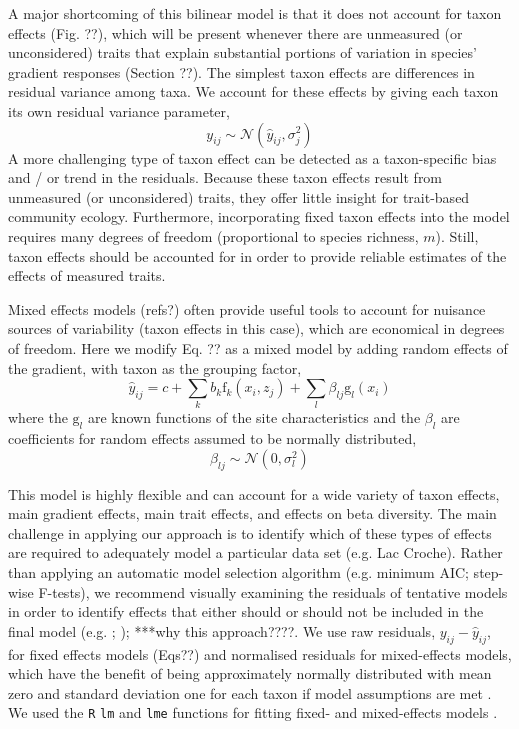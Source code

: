 \documentclass[12pt]{ecology}
\begin{document}
A major shortcoming of this bilinear model is that it does not account for taxon effects (Fig. ??), which will be present whenever there are unmeasured (or unconsidered) traits that explain substantial portions of variation in species' gradient responses (Section ??).  The simplest taxon effects are differences in residual variance among taxa.  We account for these effects by giving each taxon its own residual variance parameter,
\begin{equation}
y_{ij} \sim \mathcal{N}(\hat{y}_{ij},\sigma_j^2)
\end{equation}
A more challenging type of taxon effect can be detected as a taxon-specific bias and / or trend in the residuals.  Because these taxon effects result from unmeasured (or unconsidered) traits, they offer little insight for trait-based community ecology.  Furthermore, incorporating fixed taxon effects into the model requires many degrees of freedom (proportional to species richness, $m$).  Still, taxon effects should be accounted for in order to provide reliable estimates of the effects of measured traits.

Mixed effects models (refs?) often provide useful tools to account for nuisance sources of variability (taxon effects in this case), which are economical in degrees of freedom.  Here we modify Eq. ?? as a mixed model by adding random effects of the gradient, with taxon as the grouping factor,
\begin{equation}
\hat{y}_{ij} = c + 
	\sum_k b_k \mathrm{f}_k (x_i, z_j) + 
	\sum_l \beta_{lj} \mathrm{g}_l (x_i)
\end{equation}
where the $\mathrm{g}_l$ are known functions of the site characteristics and the $\beta_l$ are coefficients for random effects assumed to be normally distributed,
\begin{equation}
\beta_{lj} \sim \mathcal{N}(0,\sigma_l^2)
\end{equation}

This model is highly flexible and can account for a wide variety of taxon effects, main gradient effects, main trait effects, and effects on beta diversity.  The main challenge in applying our approach is to identify which of these types of effects are required to adequately model a particular data set (e.g. Lac Croche).  Rather than applying an automatic model selection algorithm (e.g. minimum AIC; step-wise F-tests), we recommend visually examining the residuals of tentative models in order to identify effects that either should or should not be included in the final model (e.g. ; ); ***why this approach????.  We use raw residuals, $y_{ij} - \hat{y}_{ij}$, for fixed effects models (Eqs??) and normalised residuals for mixed-effects models, which have the benefit of being approximately normally distributed with mean zero and standard deviation one for each taxon if model assumptions are met \citep{PinheiroAndBates2000}.  We used the \texttt{R} \texttt{lm} and \texttt{lme} functions for fitting fixed- and mixed-effects models \citep{R2009}.
\end{document}
